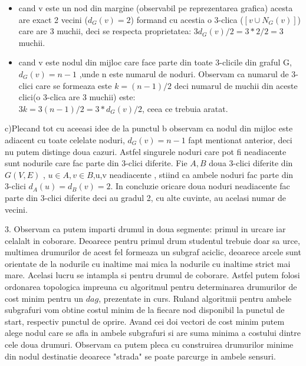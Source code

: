 \documentclass[11pt,leqno]{article}
\begin{document}
\begin{itemize}
    \item cand v este un nod din margine (observabil pe reprezentarea grafica) acesta are exact 2 vecini ($d_G(v)=2$) formand cu acestia o 3-clica ($[{v} \cup N_G(v)]$) care are 3 muchii, deci se respecta proprietatea: $3d_G(v)/2=3*2/2=3$ muchii.
    \item cand v este nodul din mijloc care face parte din toate 3-clicile din graful G,  $d_G(v)=n-1$ ,unde n este numarul de noduri. Observam ca numarul de 3-clici care se formeaza este  $k=(n-1)/2$  deci numarul de muchii din aceste clici(o 3-clica are 3 muchii) este: \\$3k=3(n-1)/2=3*d_G(v)/2$, ceea ce trebuia aratat.
\end{itemize}
c)Plecand tot cu aceeasi idee de la punctul b observam ca nodul din mijloc este adiacent cu toate celelate noduri,  $d_G(v)=n-1$ fapt mentionat anterior, deci nu putem distinge doua cazuri. Astfel singurele noduri care pot fi neadiacente sunt nodurile care fac parte din 3-clici diferite. Fie $A,B$ doua 3-clici diferite din $G(V,E)$ , $u \in A , v \in B$,u,v neadiacente , stiind ca ambele noduri fac parte din 3-clici $d_A(u)=d_B(v)=2$. 
In concluzie oricare doua noduri neadiacente fac parte din  3-clici diferite deci au gradul 2, cu alte cuvinte, au acelasi numar de vecini.

\vspace{0.5cm}

3. 
Observam ca putem imparti drumul in doua segmente: primul in urcare iar celalalt in coborare. Deoarece pentru primul drum studentul trebuie doar sa urce, multimea drumurilor de acest fel formeaza un subgraf aciclic, deoarece arcele sunt orientate de la nodurile cu inaltime mai mica la nodurile cu inaltime strict mai mare.
Acelasi lucru se intampla si pentru drumul de coborare. Astfel putem folosi ordonarea topologica impreuna cu algoritmul pentru determinarea drumurilor de cost minim pentru un $dag$, prezentate in curs.
Ruland algoritmii pentru ambele subgrafuri vom obtine costul minim de la fiecare nod disponibil la punctul de start, respectiv punctul de oprire. Avand cei doi vectori de cost minim putem alege nodul care 
se afla in ambele subgrafuri si are suma minima a costului dintre cele doua drumuri. Observam ca putem pleca cu construirea drumurilor minime din nodul destinatie deoarece "strada" se poate parcurge in ambele sensuri.
\end{document}
